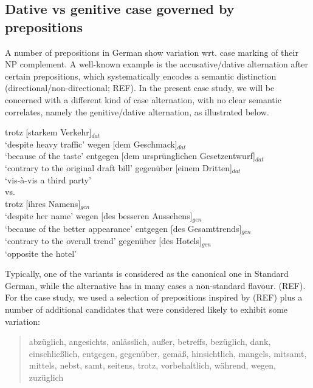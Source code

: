 \documentclass[11pt]{article}
\begin{document}
\subsection{Dative vs genitive case governed by prepositions}

A number of prepositions in German show variation wrt. case marking of their NP complement. A well-known example is the accusative/dative alternation after certain prepositions, which systematically encodes a semantic distinction (directional/non-directional; REF). In the present case study, we will be concerned with a different kind of case alternation, with no clear semantic correlates, namely the genitive/dative alternation, as illustrated below. 

\begin{exe}
  \ex trotz [starkem Verkehr]$_{dat}$\\
       `despite heavy traffic'
  \ex wegen [dem Geschmack]$_{dat}$\\
       `because of the taste'
  \ex entgegen [dem urspr\"unglichen Gesetzentwurf]$_{dat}$\\
       `contrary to the original draft bill' 
  \ex gegenüber [einem Dritten]$_{dat}$\\
       `vis-à-vis a third party'\\[2ex]
       vs.\\
  \ex trotz [ihres Namens]$_{gen}$\\ 
       `despite her name'
  \ex wegen [des besseren Aussehens]$_{gen}$\\ 
       `because of the better appearance'
  \ex entgegen [des Gesamttrends]$_{gen}$\\ 
       `contrary to the overall trend'
  \ex gegen\"uber [des Hotels]$_{gen}$\\ 
       `opposite the hotel' 
\end{exe}


Typically, one of the variants is considered as the canonical one in Standard German, while the alternative has in many cases a non-standard flavour. (REF). For the case study, we used a selection of prepositions inspired by (REF) plus a number of additional candidates that were considered likely to exhibit some variation:
 
 \begin{quote} 
   abzüglich, angesichts, anlässlich, au{\ss}er, betreffs, bezüglich, dank, einschlie{\ss}lich, entgegen, gegenüber, gemä{\ss}, hinsichtlich, mangels, mitsamt, mittels, nebst, samt, seitens, trotz, vorbehaltlich, während, wegen, zuzüglich
 \end{quote}
\end{document}
